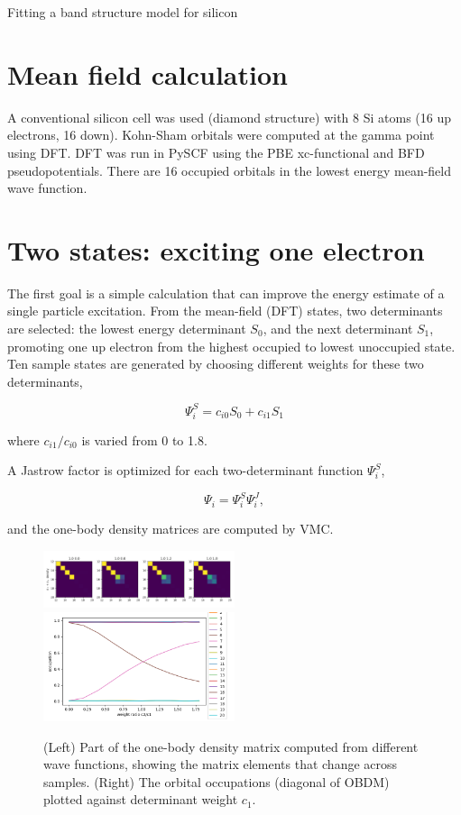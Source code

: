



\begin{center}
{\Large Fitting a band structure model for silicon}
\end{center}

\section{Mean field calculation}

A conventional silicon cell was used (diamond structure) with 8 Si atoms (16 up electrons, 16 down).
Kohn-Sham orbitals were computed at the gamma point using DFT.
DFT was run in PySCF using the PBE xc-functional and BFD pseudopotentials.
There are 16 occupied orbitals in the lowest energy mean-field wave function.


\section {Two states: exciting one electron}


The first goal is a simple calculation that can improve the energy estimate of a single particle excitation.
From the mean-field (DFT) states, two determinants are selected: the lowest energy determinant $S_0$, and the next determinant $S_1$, promoting one up electron from the highest occupied to lowest unoccupied state.
Ten sample states are generated by choosing different weights for these two determinants,

\[ \Psi_i^S = c_{i0}S_0 + c_{i1}S_1 \]

where $c_{i1}/c_{i0}$  is varied from 0 to 1.8.

A Jastrow factor is optimized for each two-determinant function $\Psi_i^S$,

\[\Psi_i = \Psi_i^S \Psi_i^J,\]

and the one-body density matrices are computed by VMC.


\begin{figure}[h]
\includegraphics[width=0.5\textwidth]{images/vmc_obdm.png}
\includegraphics[width=0.5\textwidth]{images/vmc_occupations.png}
\caption{
(Left) Part of the one-body density matrix computed from different wave functions, showing the matrix elements that change across samples. 
(Right) The orbital occupations (diagonal of OBDM) plotted against determinant weight $c_1$.
}
\label{fig:obdm}
\end{figure}

